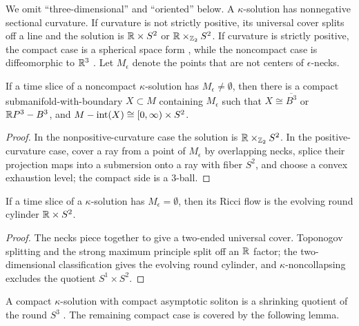 We omit ``three-dimensional'' and ``oriented'' below. A $\kappa$-solution has
nonnegative sectional curvature. If curvature is not strictly positive, its
universal cover splits off a line and the solution is
${\mathbb R}\times S^2$ or ${\mathbb R}\times_{{\mathbb Z}_2}S^2$. If curvature is strictly positive,
the compact case is a spherical space form \cite{Hamiltonnnnn}, while the
noncompact case is diffeomorphic to ${\mathbb R}^3$ \cite{Cheeger-Gromoll}. Let
$M_\epsilon$ denote the points that are not centers of $\epsilon$-necks.

\begin{lemma}
  \label{lem:kl-three-dimensional-solutions-existence-kappa-solutions}
 \label{noncompactsoliton}
If a time slice of a noncompact $\kappa$-solution has
$M_\epsilon\ne\emptyset$, then there is a compact submanifold-with-boundary
$X\subset M$ containing $M_\epsilon$ such that
$X\cong\overline{B^3}$ or ${\mathbb R} P^3-B^3$, and
$M-\operatorname{int}(X)\cong[0,\infty)\times S^2$.
\end{lemma}
\begin{proof}
\sketch In the nonpositive-curvature case the solution is
${\mathbb R}\times_{{\mathbb Z}_2}S^2$. In the positive-curvature case, cover a ray from a
point of $M_\epsilon$ by overlapping necks, splice their projection maps into
a submersion onto a ray with fiber $S^2$, and choose a convex exhaustion level;
the compact side is a $3$-ball.
\end{proof}

\begin{lemma}
  \label{lem:kl-three-dimensional-solutions-kappa-solutions-lemma}
 \label{onlyneck}
If a time slice of a $\kappa$-solution has $M_\epsilon=\emptyset$, then its
Ricci flow is the evolving round cylinder ${\mathbb R}\times S^2$.
\end{lemma}
\begin{proof}
\sketch The necks piece together to give a two-ended universal cover.
Toponogov splitting and the strong maximum principle split off an ${\mathbb R}$ factor;
the two-dimensional classification gives the evolving round cylinder, and
$\kappa$-noncollapsing excludes the quotient $S^1\times S^2$.
\end{proof}

A compact $\kappa$-solution with compact asymptotic soliton is a shrinking
quotient of the round $S^3$ \cite{Hamiltonnnnn}. The remaining compact case is
covered by the following lemma.

